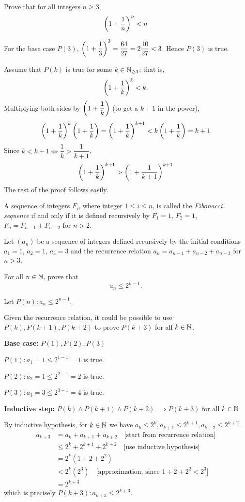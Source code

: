 \begin{exercise}
Prove that for all integers $n \ge 3$, 
\[ \left(1+\frac{1}{n}\right)^n<n \]
\end{exercise}

\begin{solution}
For the base case $P(3)$, $\left(1+\dfrac{1}{3}\right)^3=\dfrac{64}{27}=2\dfrac{10}{27}<3$. Hence $P(3)$ is true.

Assume that $P(k)$ is true for some $k\in\mathbb N_{\ge3}$; that is,
\[\left(1+\frac{1}{k}\right)^k<k.\]
Multiplying both sides by $\left(1+\dfrac{1}{k}\right)$ (to get a $k+1$ in the power),
\[ \left(1+\frac{1}{k}\right)^k\left(1+\frac{1}{k}\right)=\left(1+\frac{1}{k}\right)^{k+1}<k\left(1+\frac{1}{k}\right)=k+1  \]
Since $k<k+1 \iff \dfrac{1}{k}>\dfrac{1}{k+1}$, 
\[ \left(1+\frac{1}{k}\right)^{k+1} > \left(1+\frac{1}{k+1}\right)^{k+1} \]
The rest of the proof follows easily.
\end{solution}

A sequence of integers $F_i$, where integer $1\le i\le n$, is called the \emph{Fibonacci sequence} if and only if it is defined recursively by $F_1=1$, $F_2=1$, $F_n=F_{n-1}+F_{n-2}$ for $n>2$.

\begin{exercise}
Let $(a_n)$ be a sequence of integers defined recursively by the initial conditions $a_1=1$, $a_2=1$, $a_3=3$ and the recurrence relation $a_n=a_{n-1}+a_{n-2}+a_{n-3}$ for $n>3$.

For all $n\in\mathbb N$, prove that
\[ a_n\le2^{n-1}. \]
\end{exercise}

\begin{solution}
Let $P(n):a_n\le2^{n-1}$.

Given the recurrence relation, it could be possible to use $P(k),P(k+1),P(k+2)$ to prove $P(k+3)$ for all $k\in\mathbb N$.

\textbf{Base case:} $P(1),P(2),P(3)$

$P(1):a_1=1\le2^{1-1}=1$ is true.

$P(2):a_2=1\le2^{2-1}=2$ is true.

$P(3):a_3=3\le2^{3-1}=4$ is true.

\textbf{Inductive step:} $P(k)\land P(k+1)\land P(k+2)\implies P(k+3)$ for all $k\in\mathbb N$

By inductive hypothesis, for $k\in\mathbb N$ we have $a_k\le2^k, a_{k+1}\le2^{k+1}, a_{k+2}\le2^{k+2}$.
\begin{align*}
a_{k+3} &= a_k+a_{k+1}+a_{k+2} \quad \text{[start from recurrence relation]} \\
&\le 2^k+2^{k+1}+2^{k+2} \quad \text{[use inductive hypothesis]} \\
&= 2^k(1+2+2^2) \\
&< 2^k(2^3) \quad \text{[approximation, since $1+2+2^2<2^3$]} \\
&= 2^{k+3}
\end{align*}
which is precisely $P(k+3):a_{k+3}\le2^{k+3}$.
\end{solution}


